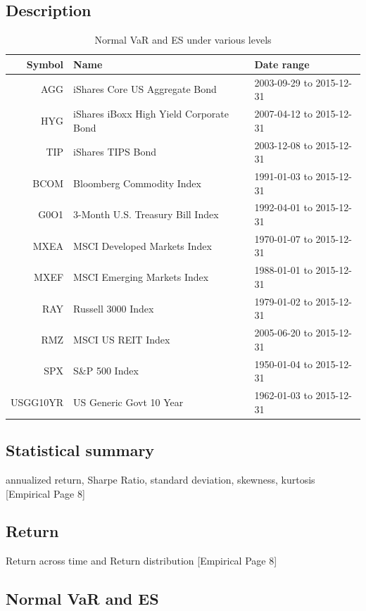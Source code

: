 \documentclass[11pt]{article}
\begin{document}
\subsection{Description}
\begin{table}[H]
\centering 
\begin{tabular}{ | r | p{7cm}  | p{4.5cm} | } 
 \hline 
Symbol & Name & Date range \\ \hline
AGG & iShares Core US Aggregate Bond & 2003-09-29 to 2015-12-31 \\
HYG & iShares iBoxx High Yield Corporate Bond & 2007-04-12 to 2015-12-31 \\
TIP & iShares TIPS Bond & 2003-12-08 to 2015-12-31 \\
BCOM & Bloomberg Commodity Index & 1991-01-03 to 2015-12-31 \\
G0O1 & 3-Month U.S. Treasury Bill Index & 1992-04-01 to 2015-12-31 \\
MXEA & MSCI Developed Markets Index & 1970-01-07 to 2015-12-31 \\
MXEF & MSCI Emerging Markets Index & 1988-01-01 to 2015-12-31 \\
RAY & Russell 3000 Index & 1979-01-02 to 2015-12-31 \\
RMZ & MSCI US REIT Index & 2005-06-20 to 2015-12-31 \\
SPX & S\&P 500 Index & 1950-01-04 to 2015-12-31 \\
USGG10YR & US Generic Govt 10 Year & 1962-01-03 to 2015-12-31 \\
 \hline
\end{tabular}
\caption{Normal VaR and ES under various levels}
\label{table:AssetDescription}
\end{table}


\subsection{Statistical summary}
annualized return, Sharpe Ratio, standard deviation, skewness, kurtosis [Empirical Page 8]

\subsection{Return}
Return across time and Return distribution [Empirical Page 8]

\subsection{Normal VaR and ES}
\end{document}
